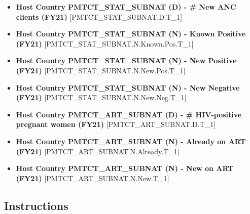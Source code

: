 \documentclass[
  openany]{book}
\begin{document}
\begin{itemize}
\item
  \textbf{Host Country PMTCT\_STAT\_SUBNAT (D) - \# New ANC clients (FY21)}
  {[}PMTCT\_STAT\_SUBNAT.D.T\_1{]}
\item
  \textbf{Host Country PMTCT\_STAT\_SUBNAT (N) - Known Positive (FY21)}
  {[}PMTCT\_STAT\_SUBNAT.N.Known.Pos.T\_1{]}
\item
  \textbf{Host Country PMTCT\_STAT\_SUBNAT (N) - New Positive (FY21)}
  {[}PMTCT\_STAT\_SUBNAT.N.New.Pos.T\_1{]}
\item
  \textbf{Host Country PMTCT\_STAT\_SUBNAT (N) - New Negative (FY21)}
  {[}PMTCT\_STAT\_SUBNAT.N.New.Neg.T\_1{]}
\item
  \textbf{Host Country PMTCT\_ART\_SUBNAT (D) - \# HIV-positive pregnant women
  (FY21)} {[}PMTCT\_ART\_SUBNAT.D.T\_1{]}
\item
  \textbf{Host Country PMTCT\_ART\_SUBNAT (N) - Already on ART (FY21)}
  {[}PMTCT\_ART\_SUBNAT.N.Already.T\_1{]}
\item
  \textbf{Host Country PMTCT\_ART\_SUBNAT (N) - New on ART (FY21)}
  {[}PMTCT\_ART\_SUBNAT.N.New.T\_1{]}
\end{itemize}

\hypertarget{instructions-9}{%
\subsection{Instructions}\label{instructions-9}}
\end{document}
